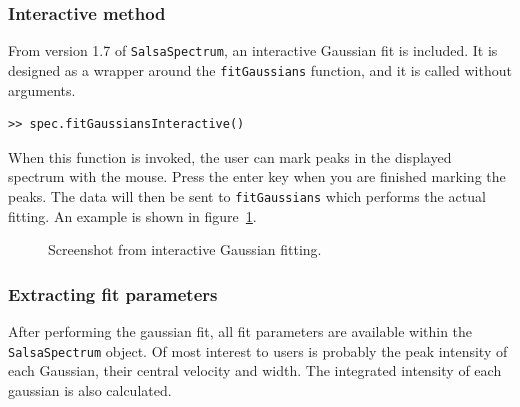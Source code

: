 \documentclass[11pt,a4paper]{article}
\begin{document}
\subsubsection{Interactive method}
\label{sec:interactive-method}

From version 1.7 of \texttt{SalsaSpectrum}, an interactive Gaussian
fit is included. It is designed as a wrapper around the
\texttt{fitGaussians} function, and it is called without arguments.
\begin{lstlisting}
>> spec.fitGaussiansInteractive()
\end{lstlisting}
When this function is invoked, the user can mark peaks in the
displayed spectrum with the mouse. Press the enter key when you are
finished marking the peaks. The data will then be sent to
\texttt{fitGaussians} which performs the actual fitting. An example is
shown in figure~\ref{fig:intergauss}.

\begin{figure}[h!]
  \centering
  \caption{Screenshot from interactive Gaussian fitting.}
  \label{fig:intergauss}
\end{figure}

\subsubsection{Extracting fit parameters}
\label{sec:extr-fit-param}

After performing the gaussian fit, all fit parameters are available
within the \texttt{SalsaSpectrum} object. Of most interest to users is
probably the peak intensity of each Gaussian, their central velocity
and width. The integrated intensity of each gaussian is also
calculated.
\end{document}
